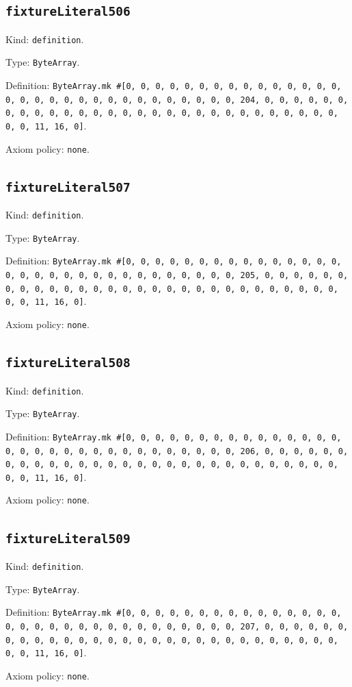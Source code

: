 \documentclass[11pt]{article}
\begin{document}
\subsection*{\texttt{fixtureLiteral506}}
\noindent Kind: \texttt{definition}.\par
\noindent Type: \texttt{ByteArray}.\par
\noindent Definition: \texttt{ByteArray.mk \#[0, 0, 0, 0, 0, 0, 0, 0, 0, 0, 0, 0, 0, 0, 0, 0, 0, 0, 0, 0, 0, 0, 0, 0, 0, 0, 0, 0, 0, 0, 0, 204, 0, 0, 0, 0, 0, 0, 0, 0, 0, 0, 0, 0, 0, 0, 0, 0, 0, 0, 0, 0, 0, 0, 0, 0, 0, 0, 0, 0, 0, 0, 0, 11, 16, 0]}.\par
\noindent Axiom policy: \texttt{none}.\par
\subsection*{\texttt{fixtureLiteral507}}
\noindent Kind: \texttt{definition}.\par
\noindent Type: \texttt{ByteArray}.\par
\noindent Definition: \texttt{ByteArray.mk \#[0, 0, 0, 0, 0, 0, 0, 0, 0, 0, 0, 0, 0, 0, 0, 0, 0, 0, 0, 0, 0, 0, 0, 0, 0, 0, 0, 0, 0, 0, 0, 205, 0, 0, 0, 0, 0, 0, 0, 0, 0, 0, 0, 0, 0, 0, 0, 0, 0, 0, 0, 0, 0, 0, 0, 0, 0, 0, 0, 0, 0, 0, 0, 11, 16, 0]}.\par
\noindent Axiom policy: \texttt{none}.\par
\subsection*{\texttt{fixtureLiteral508}}
\noindent Kind: \texttt{definition}.\par
\noindent Type: \texttt{ByteArray}.\par
\noindent Definition: \texttt{ByteArray.mk \#[0, 0, 0, 0, 0, 0, 0, 0, 0, 0, 0, 0, 0, 0, 0, 0, 0, 0, 0, 0, 0, 0, 0, 0, 0, 0, 0, 0, 0, 0, 0, 206, 0, 0, 0, 0, 0, 0, 0, 0, 0, 0, 0, 0, 0, 0, 0, 0, 0, 0, 0, 0, 0, 0, 0, 0, 0, 0, 0, 0, 0, 0, 0, 11, 16, 0]}.\par
\noindent Axiom policy: \texttt{none}.\par
\subsection*{\texttt{fixtureLiteral509}}
\noindent Kind: \texttt{definition}.\par
\noindent Type: \texttt{ByteArray}.\par
\noindent Definition: \texttt{ByteArray.mk \#[0, 0, 0, 0, 0, 0, 0, 0, 0, 0, 0, 0, 0, 0, 0, 0, 0, 0, 0, 0, 0, 0, 0, 0, 0, 0, 0, 0, 0, 0, 0, 207, 0, 0, 0, 0, 0, 0, 0, 0, 0, 0, 0, 0, 0, 0, 0, 0, 0, 0, 0, 0, 0, 0, 0, 0, 0, 0, 0, 0, 0, 0, 0, 11, 16, 0]}.\par
\noindent Axiom policy: \texttt{none}.\par
\end{document}
